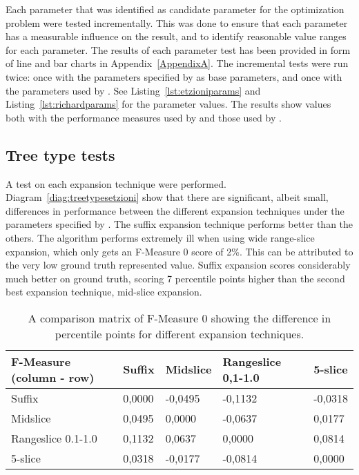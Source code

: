 Each parameter that was identified as candidate parameter for the optimization problem were tested incrementally. This was done to ensure that each parameter has a measurable influence on the result, and to identify reasonable value ranges for each parameter. The results of each parameter test has been provided in form of line and bar charts in Appendix~\ref{AppendixA}. The incremental tests were run twice: once with the parameters specified by \citeauthor{Oren1998} as base parameters, and once with the parameters used by \supervisor. See Listing~\ref{lst:etzioniparams} and Listing~\ref{lst:richardparams} for the parameter values. The results show values both with the performance measures used by \supervisor and those used by \citeauthor{Oren1998}.

\subsection{Tree type tests}
A test on each expansion technique were performed. Diagram~\ref{diag:treetypesetzioni} show that there are significant, albeit small, differences in performance between the different expansion techniques under the parameters specified by \citeauthor{Oren1998}. The suffix expansion technique performs better than the others. The algorithm performs extremely ill when using wide range-slice expansion, which only gets an F-Measure 0 score of 2\%. This can be attributed to the very low ground truth represented value. Suffix expansion scores considerably much better on ground truth, scoring 7 percentile points higher than the second best expansion technique, mid-slice expansion.

\begin{table}
\begin{center}
\begin{tabular}{|l|llll|}
\hline
F-Measure (column - row) & Suffix & Midslice & Rangeslice 0,1-1.0 & 5-slice \\
\hline
Suffix                        & 0,0000 & -0,0495  & -0,1132            & -0,0318 \\
Midslice                      & 0,0495 & 0,0000   & -0,0637            & 0,0177  \\
Rangeslice 0.1-1.0            & 0,1132 & 0,0637   & 0,0000             & 0,0814  \\
5-slice                       & 0,0318 & -0,0177  & -0,0814            & 0,0000  \\
\hline
\end{tabular}
  \caption{A comparison matrix of F-Measure 0 showing the difference in percentile points for different expansion techniques.}
  \label{tab:expansiontechniques}
\end{center}
\end{table}

